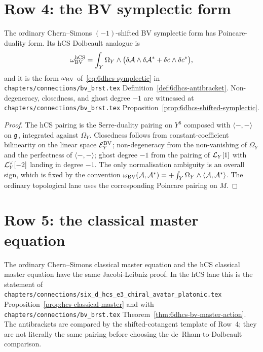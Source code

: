 \section{Row 4: the BV symplectic form}
\label{sec:cfg-row-4-symplectic}

\begin{theorem}
\label{thm:cfg-row-4}
The ordinary Chern--Simons $(-1)$-shifted BV symplectic form has
Poincare-duality form. Its hCS Dolbeault analogue is
\[
 \omega^{\mathrm{hCS}}_{\mathrm{BV}}
 = \int_Y\Omega_Y\wedge\bigl(\delta\mathcal{A}\wedge\delta\mathcal{A}^*
 +\delta c\wedge \delta c^*\bigr),
\]
and it is the form $\omega_{\mathrm{BV}}$
of~\eqref{eq:6dhcs-symplectic} in
\texttt{chapters/connections/bv\_brst.tex}
Definition~\ref{def:6dhcs-antibracket}. Non-degeneracy, closedness,
and ghost degree $-1$ are witnessed at
\texttt{chapters/connections/bv\_brst.tex}
Proposition~\ref{prop:6dhcs-shifted-symplectic}.
\end{theorem}

\begin{proof}
The hCS pairing is the Serre-duality pairing on $Y^6$ composed with
$\langle-,-\rangle$ on $\mathfrak{g}$, integrated against $\Omega_Y$. Closedness
follows from constant-coefficient bilinearity on the linear space
$\mathcal{E}^{\mathrm{BV}}_Y$; non-degeneracy from the non-vanishing of $\Omega_Y$ and
the perfectness of $\langle-,-\rangle$; ghost degree $-1$ from the
pairing of $\mathcal{L}_Y[1]$ with $\mathcal{L}_Y^\vee[-2]$ landing in degree
$-1$. The only normalisation ambiguity is an overall sign, which is
fixed by the convention
$\omega_{\mathrm{BV}}(\mathcal{A},\mathcal{A}^*) = +\int_Y\Omega_Y\wedge\langle\mathcal{A},\mathcal{A}^*\rangle$.
The ordinary topological lane uses the corresponding Poincare pairing
on $M$.
\end{proof}

\section{Row 5: the classical master equation}
\label{sec:cfg-row-5-classical-master}

\begin{theorem}
\label{thm:cfg-row-5}
The ordinary Chern--Simons classical master equation and the hCS
classical master equation have the same Jacobi-Leibniz proof. In the
hCS lane this is the statement of
\texttt{chapters/connections/six\_d\_hcs\_e3\_chiral\_avatar\_platonic.tex}
Proposition~\ref{prop:hcs-classical-master} and with
\texttt{chapters/connections/bv\_brst.tex}
Theorem~\ref{thm:6dhcs-bv-master-action}. The antibrackets are compared
by the shifted-cotangent template of Row~4; they are not literally the
same pairing before choosing the de~Rham-to-Dolbeault comparison.
\end{theorem}

